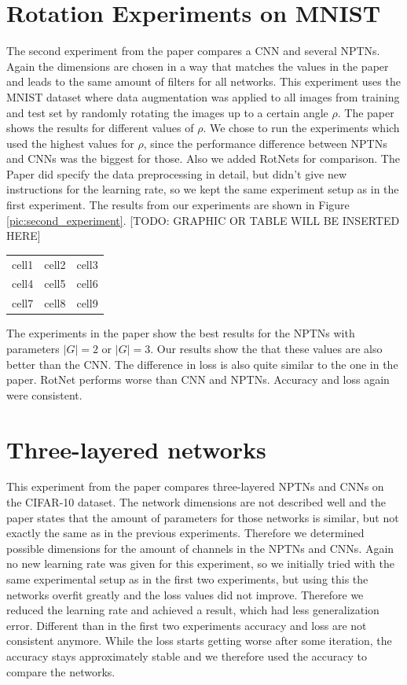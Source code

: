 \documentclass{llncs}
\begin{document}
\section{Rotation Experiments on MNIST}
The second experiment from the paper compares a CNN and several NPTNs. Again the dimensions are chosen in a way that matches the values in the paper and leads to the same amount of filters for all networks. 
This experiment uses the MNIST dataset \cite{MNIST} where data augmentation was applied to all images from training and test set by randomly rotating the images up to a certain angle $\rho$. 
The paper shows the results for different values of $\rho$. We chose to run the experiments which used the highest values for $\rho$, since the performance difference between NPTNs and CNNs was the biggest for those. Also we added RotNets for comparison.
The Paper did specify the data preprocessing in detail, but didn't give new instructions for the learning rate, so we kept the same experiment setup as in the first experiment.
The results from our experiments are shown in Figure \ref{pic:second_experiment}. 
[TODO: GRAPHIC OR TABLE WILL BE INSERTED HERE]


\begin{center}
\begin{tabular}{ |c|c|c| } 
 \hline \hline
 cell1 & cell2 & cell3 \\ 
 cell4 & cell5 & cell6 \\ 
 cell7 & cell8 & cell9 \\ 
 \hline
\end{tabular}
\end{center}



The experiments in the paper show the best results for the NPTNs with parameters $|G|=2$ or $|G|=3$. Our results show the that these values are also better than the CNN. The difference in loss is also quite similar to the one in the paper. RotNet performs worse than CNN and NPTNs. Accuracy and loss again were consistent. 

\section{Three-layered networks}
This experiment from the paper compares three-layered NPTNs and CNNs on the CIFAR-10 \cite{CIFAR} dataset. 
The network dimensions are not described well and the paper states that the amount of parameters for those networks is similar, but not exactly the same as in the previous experiments. 
Therefore we determined possible dimensions for the amount of channels in the NPTNs and CNNs. 
Again no new learning rate was given for this experiment, so we initially tried with the same experimental setup as in the first two experiments, but using this the networks overfit greatly and the loss values did not improve. 
Therefore we reduced the learning rate and achieved a result, which had less generalization error. 
Different than in the first two experiments accuracy and loss are not consistent anymore. While the loss starts getting worse after some iteration, the accuracy stays approximately stable and we therefore used the accuracy to compare the networks.
\end{document}
